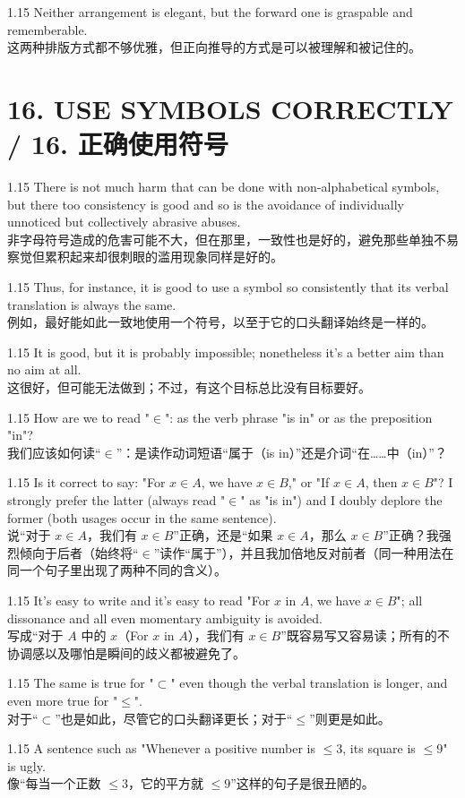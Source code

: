 \documentclass[12pt,a4paper]{article}
\newcommand{\bilingual}[2]{
    \begin{spacing}{1.15} %
        \noindent \normalsize #1 \\[-0.5ex] %
        \small \textcolor{blue!70!black}{#2} %
    \end{spacing}
    \vspace{0.8em} %
}
\begin{document}
\bilingual{Neither arrangement is elegant, but the forward one is graspable and rememberable.}
{这两种排版方式都不够优雅，但正向推导的方式是可以被理解和被记住的。} %

\section*{16. USE SYMBOLS CORRECTLY / 16. 正确使用符号} %

\bilingual{There is not much harm that can be done with non-alphabetical symbols, but there too consistency is good and so is the avoidance of individually unnoticed but collectively abrasive abuses.}
{非字母符号造成的危害可能不大，但在那里，一致性也是好的，避免那些单独不易察觉但累积起来却很刺眼的滥用现象同样是好的。} %

\bilingual{Thus, for instance, it is good to use a symbol so consistently that its verbal translation is always the same.}
{例如，最好能如此一致地使用一个符号，以至于它的口头翻译始终是一样的。} %

\bilingual{It is good, but it is probably impossible; nonetheless it's a better aim than no aim at all.}
{这很好，但可能无法做到；不过，有这个目标总比没有目标要好。} %

\bilingual{How are we to read "$\in$": as the verb phrase "is in" or as the preposition "in"?}
{我们应该如何读“$\in$”：是读作动词短语“属于（is in）”还是介词“在……中（in）”？} %

\bilingual{Is it correct to say: "For $x\in A$, we have $x\in B$," or "If $x\in A$, then $x\in B$"? I strongly prefer the latter (always read "$\in$" as "is in") and I doubly deplore the former (both usages occur in the same sentence).}
{说“对于 $x\in A$，我们有 $x\in B$”正确，还是“如果 $x\in A$，那么 $x\in B$”正确？我强烈倾向于后者（始终将“$\in$”读作“属于”），并且我加倍地反对前者（同一种用法在同一个句子里出现了两种不同的含义）。} %

\bilingual{It's easy to write and it's easy to read "For $x$ in $A$, we have $x\in B$"; all dissonance and all even momentary ambiguity is avoided.}
{写成“对于 $A$ 中的 $x$（For $x$ in $A$），我们有 $x\in B$”既容易写又容易读；所有的不协调感以及哪怕是瞬间的歧义都被避免了。} %

\bilingual{The same is true for "$\subset$" even though the verbal translation is longer, and even more true for "$\le$".}
{对于“$\subset$”也是如此，尽管它的口头翻译更长；对于“$\le$”则更是如此。} %

\bilingual{A sentence such as "Whenever a positive number is $\le3$, its square is $\le9$" is ugly.}
{像“每当一个正数 $\le 3$，它的平方就 $\le 9$”这样的句子是很丑陋的。} %
\end{document}
